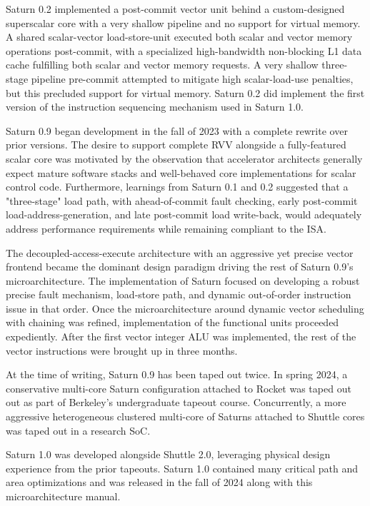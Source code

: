 Saturn 0.2 implemented a post-commit vector unit behind a custom-designed superscalar core with a very shallow pipeline and no support for virtual memory.
A shared scalar-vector load-store-unit executed both scalar and vector memory operations post-commit, with a specialized high-bandwidth non-blocking L1 data cache fulfilling both scalar and vector memory requests.
A very shallow three-stage pipeline pre-commit attempted to mitigate high scalar-load-use penalties, but this precluded support for virtual memory.
Saturn 0.2 did implement the first version of the instruction sequencing mechanism used in Saturn 1.0.

Saturn 0.9 began development in the fall of 2023 with a complete rewrite over prior versions.
The desire to support complete RVV alongside a fully-featured scalar core was motivated by the observation that accelerator architects generally expect mature software stacks and well-behaved core implementations for scalar control code.
Furthermore, learnings from Saturn 0.1 and 0.2 suggested that a "three-stage" load path, with ahead-of-commit fault checking, early post-commit load-address-generation, and late post-commit load write-back, would adequately address performance requirements while remaining compliant to the ISA.

The decoupled-access-execute architecture with an aggressive yet precise vector frontend became the dominant design paradigm driving the rest of Saturn 0.9's microarchitecture.
The implementation of Saturn focused on developing a robust precise fault mechanism, load-store path, and dynamic out-of-order instruction issue in that order.
Once the microarchitecture around dynamic vector scheduling with chaining was refined, implementation of the functional units proceeded expediently.
After the first vector integer ALU was implemented, the rest of the vector instructions were brought up in three months.


At the time of writing, Saturn 0.9 has been taped out twice.
In spring 2024, a conservative multi-core Saturn configuration attached to Rocket was taped out out as part of Berkeley's undergraduate tapeout course.
Concurrently, a more aggressive heterogeneous clustered multi-core of Saturns attached to Shuttle cores was taped out in a research SoC.

Saturn 1.0 was developed alongside Shuttle 2.0, leveraging physical design experience from the prior tapeouts.
Saturn 1.0 contained many critical path and area optimizations and was released in the fall of 2024 along with this microarchitecture manual.

